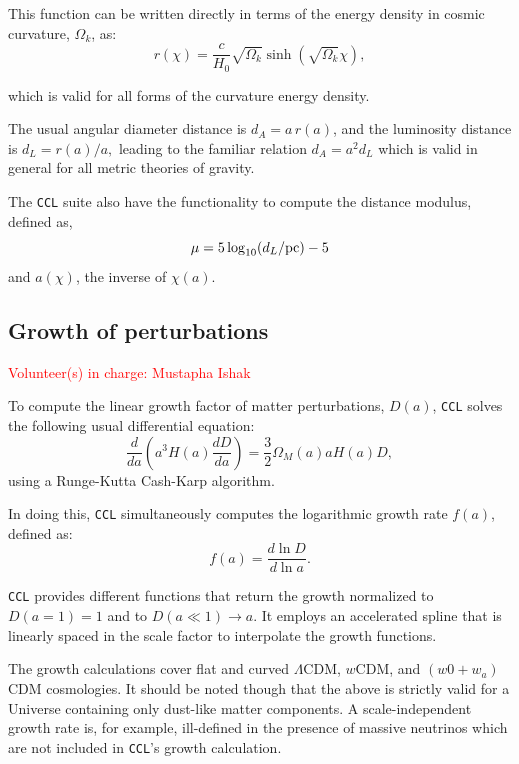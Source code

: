 \documentclass[\docopts]{\docclass}
\newcommand{\vol}[1]{\textcolor{red}{Volunteer(s) in charge: #1}}
\newcommand{\ccl}{{\tt CCL}\xspace}
\begin{document}
This function can be written directly in terms of the energy density in cosmic curvature, $\Omega_k$, as:
\begin{equation}\label{eq:angdist_omegak}
 r(\chi)=                 \frac{c}{H_0}\sqrt{\Omega_k}\sinh(\sqrt{\Omega_k}\chi),
\end{equation}

which is valid for all forms of the curvature energy density.

The usual angular diameter distance is $d_A=a\,r(a)$, and the luminosity distance is
$d_L=r(a)/a,$ leading to the familiar relation $d_A = a^2d_L$ which is valid in general for all metric theories of gravity.

The \ccl suite also have the functionality to compute the distance modulus, defined as,
\begin{equation}\label{eq:distmod}
    \mu = 5 \log_{10}(d_L / {\rm pc})-5
\end{equation}
and $a(\chi)$, the inverse of $\chi(a)$.



\subsection{Growth of perturbations}
\vol{Mustapha Ishak}
\label{sec:growth}

To compute the linear growth factor of matter perturbations, $D(a)$, \ccl solves the following usual differential equation:
\begin{equation}
  \frac{d}{da}\left(a^3H(a)\frac{dD}{da}\right)=\frac{3}{2}\Omega_M(a)aH(a)D,
\end{equation}
using a Runge-Kutta Cash-Karp algorithm. 

In doing this, \ccl simultaneously computes the logarithmic growth rate $f(a)$, defined as:
\begin{equation}
  f(a)=\frac{d\ln D}{d\ln a}.
\end{equation}

\ccl provides different functions that return the growth normalized to $D(a=1)=1$ and to $D(a\ll1)\rightarrow a$. It employs an accelerated spline that is linearly spaced in the scale factor to interpolate the growth functions. 

The growth calculations cover flat and curved $\Lambda$CDM, $w$CDM, and $(w0+w_a)$CDM cosmologies. It should be noted though that the above is strictly valid for a Universe containing only dust-like matter components. A scale-independent growth rate is, for example, ill-defined in the presence of massive neutrinos which are not included in \ccl 's growth calculation. 
\end{document}
